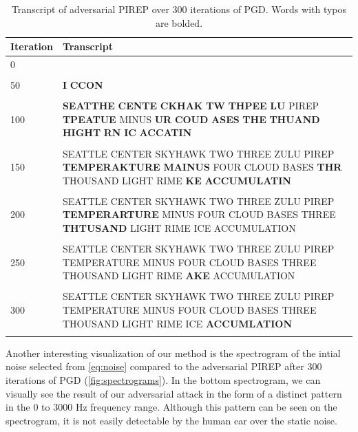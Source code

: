 \documentclass[11pt,a4paper]{article}
\begin{document}
\begin{table}
  \centering
  \begin{tabularx}{\textwidth}{lX}
    \hline
    Iteration & Transcript \\
    \hline
    0         &            \\\\
    50        & \small\textbf{I} \textbf{CCON}     \\\\
    100       & \small\textbf{SEATTHE} \textbf{CENTE} \textbf{CKHAK} \textbf{TW} \textbf{THPEE} \textbf{LU} PIREP \textbf{TPEATUE} MINUS \textbf{UR} \textbf{COUD} \textbf{ASES} \textbf{THE} \textbf{THUAND} \textbf{HIGHT} \textbf{RN} \textbf{IC} \textbf{ACCATIN} \\\\
    150       & \small SEATTLE CENTER SKYHAWK TWO THREE ZULU PIREP \textbf{TEMPERAKTURE} \textbf{MAINUS} FOUR CLOUD BASES \textbf{THR} THOUSAND LIGHT RIME \textbf{KE} \textbf{ACCUMULATIN} \\\\
    200       & \small SEATTLE CENTER SKYHAWK TWO THREE ZULU PIREP \textbf{TEMPERARTURE} MINUS FOUR CLOUD BASES THREE \textbf{THTUSAND} LIGHT RIME ICE ACCUMULATION \\\\
    250       & \small SEATTLE CENTER SKYHAWK TWO THREE ZULU PIREP TEMPERATURE MINUS FOUR CLOUD BASES THREE THOUSAND LIGHT RIME \textbf{AKE} ACCUMULATION \\\\
    300       & \small SEATTLE CENTER SKYHAWK TWO THREE ZULU PIREP TEMPERATURE MINUS FOUR CLOUD BASES THREE THOUSAND LIGHT RIME ICE \textbf{ACCUMLATION} \\\\
    \hline
  \end{tabularx}
  \caption{Transcript of adversarial PIREP over 300 iterations of PGD. Words with typos are bolded.}
  \label{tab:attack_transcript}
\end{table}

Another interesting visualization of our method is the spectrogram of the intial
noise selected from \autoref{eq:noise} compared to the adversarial PIREP after
300 iterations of PGD (\autoref{fig:spectrograms}). In the bottom spectrogram,
we can visually see the result of our adversarial attack in the form of a
distinct pattern in the 0 to 3000 Hz frequency range. Although this pattern can
be seen on the spectrogram, it is not easily detectable by the human ear over
the static noise.
\end{document}
